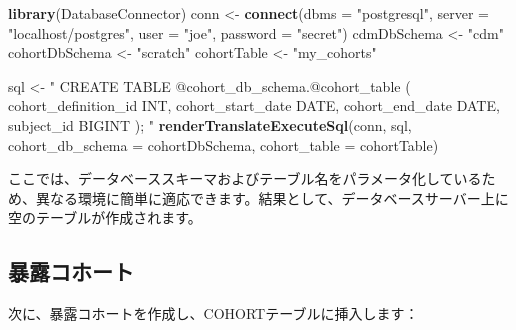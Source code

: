 \documentclass[
  11pt]{book}
\newenvironment{Shaded}{\begin{snugshade}}{\end{snugshade}}
\newcommand{\AttributeTok}[1]{\textcolor[rgb]{0.13,0.29,0.53}{#1}}
\newcommand{\FunctionTok}[1]{\textcolor[rgb]{0.13,0.29,0.53}{\textbf{#1}}}
\newcommand{\NormalTok}[1]{#1}
\newcommand{\OtherTok}[1]{\textcolor[rgb]{0.56,0.35,0.01}{#1}}
\newcommand{\StringTok}[1]{\textcolor[rgb]{0.31,0.60,0.02}{#1}}
\theoremstyle{definition}
\theoremstyle{definition}
\theoremstyle{definition}
\theoremstyle{definition}
\theoremstyle{remark}
\begin{document}
\begin{Shaded}
\begin{Highlighting}[]
\FunctionTok{library}\NormalTok{(DatabaseConnector)}
\NormalTok{conn }\OtherTok{\textless{}{-}} \FunctionTok{connect}\NormalTok{(}\AttributeTok{dbms =} \StringTok{"postgresql"}\NormalTok{,}
                \AttributeTok{server =} \StringTok{"localhost/postgres"}\NormalTok{,}
                \AttributeTok{user =} \StringTok{"joe"}\NormalTok{,}
                \AttributeTok{password =} \StringTok{"secret"}\NormalTok{)}
\NormalTok{cdmDbSchema }\OtherTok{\textless{}{-}} \StringTok{"cdm"}
\NormalTok{cohortDbSchema }\OtherTok{\textless{}{-}} \StringTok{"scratch"}
\NormalTok{cohortTable }\OtherTok{\textless{}{-}} \StringTok{"my\_cohorts"}

\NormalTok{sql }\OtherTok{\textless{}{-}} \StringTok{"}
\StringTok{CREATE TABLE @cohort\_db\_schema.@cohort\_table (}
\StringTok{  cohort\_definition\_id INT,}
\StringTok{  cohort\_start\_date DATE,}
\StringTok{  cohort\_end\_date DATE,}
\StringTok{  subject\_id BIGINT}
\StringTok{);}
\StringTok{"}
\FunctionTok{renderTranslateExecuteSql}\NormalTok{(conn, sql,}
                          \AttributeTok{cohort\_db\_schema =}\NormalTok{ cohortDbSchema,}
                          \AttributeTok{cohort\_table =}\NormalTok{ cohortTable)}
\end{Highlighting}
\end{Shaded}

ここでは、データベーススキーマおよびテーブル名をパラメータ化しているため、異なる環境に簡単に適応できます。結果として、データベースサーバー上に空のテーブルが作成されます。

\subsection{暴露コホート}\label{ux66b4ux9732ux30b3ux30dbux30fcux30c8}

次に、暴露コホートを作成し、COHORTテーブルに挿入します：
\end{document}
